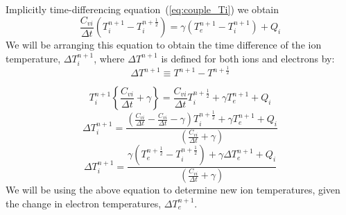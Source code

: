 \documentclass[12pt]{article}
\newcommand{\dt}{\ensuremath{\Delta t}}
\newcommand{\cviOdt}{\ensuremath{\frac{C_{vi}}{\dt}}}
\begin{document}
Implicitly time-differencing equation~(\ref{eq:couple_Ti}) we obtain
\begin{equation}
        \cviOdt ( T_{i}^{n+1}-T_{i}^{n+\frac{1}{2}}) =
                 \gamma (T_{e}^{n+1}-T_{i}^{n+1}) + Q_{i}
\end{equation}
We will be arranging this equation to obtain the time difference of
the ion temperature, $\Delta T_{i}^{n+1}$,
where $\Delta T^{n+1}$ is defined for both ions and electrons by:
\begin{equation}
   \boxed{
        \Delta T^{n+1} \equiv T^{n+1} - T^{n+\frac{1}{2}}
   }
\end{equation}

\begin{equation}
        T_{i}^{n+1}\left\{ \cviOdt + \gamma \right\} =
                \cviOdt T_{i}^{n+\frac{1}{2}} + \gamma T_{e}^{n+1} + Q_{i}
\end{equation}
\begin{equation}
        \Delta T_{i}^{n+1} = \frac{ \left( \cviOdt - \cviOdt - \gamma 
                                        \right) T_{i}^{n+\frac{1}{2}}
                         + \gamma T_{e}^{n+1} + Q_{i} }
                {(\cviOdt + \gamma)}
\end{equation}
\begin{equation}
   \boxed{
        \Delta T_{i}^{n+1} = \frac{ \gamma ( T_{e}^{n+\frac{1}{2}} - T_{i}^{n+\frac{1}{2}} )
                                + \gamma \Delta T_{e}^{n+1} + Q_{i} }
                {(\cviOdt + \gamma)}
         }
\label{eq:Tinp1}
\end{equation}
We will be using the above equation to determine new ion temperatures,
given the change in electron temperatures, $\Delta T_{e}^{n+1}$.
\end{document}
